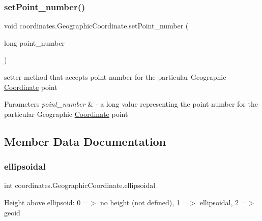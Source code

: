 \subsubsection{\texorpdfstring{set\+Point\+\_\+number()}{setPoint\_number()}}
{\footnotesize\ttfamily void coordinates.\+Geographic\+Coordinate.\+set\+Point\+\_\+number (\begin{DoxyParamCaption}\item[{long}]{point\+\_\+number }\end{DoxyParamCaption})}



setter method that accepts point number for the particular Geographic \hyperlink{classcoordinates_1_1_coordinate}{Coordinate} point 


\begin{DoxyParams}{Parameters}
{\em point\+\_\+number} & -\/ a long value representing the point number for the particular Geographic \hyperlink{classcoordinates_1_1_coordinate}{Coordinate} point \\
\hline
\end{DoxyParams}


\subsection{Member Data Documentation}
\mbox{\label{classcoordinates_1_1_geographic_coordinate_ab14ea3abf8e94174e4eff69ab983282e}} 
\subsubsection{\texorpdfstring{ellipsoidal}{ellipsoidal}}
{\footnotesize\ttfamily int coordinates.\+Geographic\+Coordinate.\+ellipsoidal\hspace{0.3cm}{\ttfamily [private]}}

Height above ellipsoid\+: 0 =$>$ no height (not defined), 1 =$>$ ellipsoidal, 2 =$>$ geoid \mbox{\label{classcoordinates_1_1_geographic_coordinate_a928334b65b117d99cd724d2c0b9b7ee0}} 
